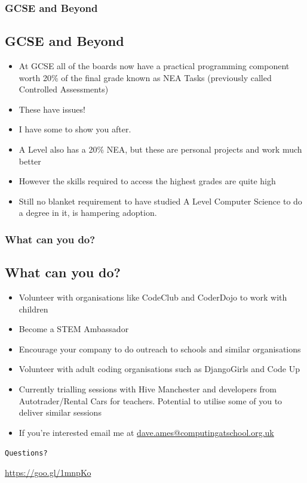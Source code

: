 \documentclass{beamer}
\begin{document}
\begin{frame}
\frametitle{GCSE and Beyond}
\subsection{GCSE and Beyond}
\begin{itemize}
  \item At GCSE all of the boards now have a practical programming component worth 20\% of the final grade known as NEA
    Tasks (previously called Controlled Assessments)
    \pause
  \item These have issues!
    \pause
  \item I have some to show you after.
    \pause
  \item A Level also has a 20\% NEA, but these are personal projects and work much better
    \pause
  \item However the skills required to access the highest grades are quite high
    \pause
  \item Still no blanket requirement to have studied A Level Computer Science to do a degree in it, is hampering
    adoption.   
\end{itemize}

\end{frame}


\begin{frame}
\frametitle{What can you do?}
\subsection{What can you do?}
\begin{itemize}
\item Volunteer with organisations like CodeClub and CoderDojo to work with children
  \pause
\item Become a STEM Ambassador
  \pause
\item Encourage your company to do outreach to schools and similar organisations
  \pause
\item Volunteer with adult coding organisations such as DjangoGirls and Code Up
  \pause
\item Currently trialling sessions with Hive Manchester and developers from Autotrader/Rental Cars for
  teachers. Potential to utilise some of you to deliver similar sessions
  \pause
\item If you're interested email me at \url{dave.ames@computingatschool.org.uk}
\end{itemize}

\end{frame}

  
\begin{frame}
\begin{center}
\begin{huge}
  \texttt{Questions?}
\end{huge}
\end{center}
\normalfont
\end{frame}

\begin{frame}
\begin{center}
  \begin{huge}
    \url{https://goo.gl/1mnpKo}
\end{huge}
\end{center}
\normalfont
\end{frame}
\end{document}
